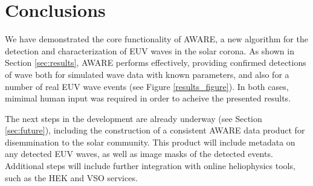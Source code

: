 \section{Conclusions}\label{sec:conclusions}

We have demonstrated the core functionality of AWARE, a new algorithm for the detection and characterization of EUV waves in the solar corona. As shown in Section \ref{sec:results}, AWARE performs effectively, providing confirmed detections of wave both for simulated wave data with known parameters, and also for a number of real EUV wave events (see Figure \ref{results_figure}). In both cases, mimimal human input was required in order to acheive the presented results. 

The next steps in the development are already underway (see Section \ref{sec:future}), including the construction of a consistent AWARE data product for disemmination to the solar community. This product will include metadata on any detected EUV waves, as well as image masks of the detected events. Additional steps will include further integration with online heliophysics tools, such as the HEK and VSO services.